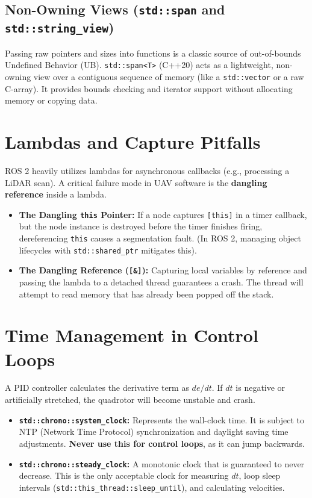 \documentclass{article}
\begin{document}
\subsection{Non-Owning Views (\texttt{std::span} and \texttt{std::string\_view})}
Passing raw pointers and sizes into functions is a classic source of out-of-bounds Undefined Behavior (UB). \texttt{std::span<T>} (C++20) acts as a lightweight, non-owning view over a contiguous sequence of memory (like a \texttt{std::vector} or a raw C-array). It provides bounds checking and iterator support without allocating memory or copying data.

\section{Lambdas and Capture Pitfalls}
ROS 2 heavily utilizes lambdas for asynchronous callbacks (e.g., processing a LiDAR scan). A critical failure mode in UAV software is the \textbf{dangling reference} inside a lambda.

\begin{itemize}
    \item \textbf{The Dangling \texttt{this} Pointer:} If a node captures \texttt{[this]} in a timer callback, but the node instance is destroyed before the timer finishes firing, dereferencing \texttt{this} causes a segmentation fault. (In ROS 2, managing object lifecycles with \texttt{std::shared\_ptr} mitigates this).
    \item \textbf{The Dangling Reference (\texttt{[\&]}):} Capturing local variables by reference and passing the lambda to a detached thread guarantees a crash. The thread will attempt to read memory that has already been popped off the stack.
\end{itemize}

\section{Time Management in Control Loops}
A PID controller calculates the derivative term as $de / dt$. If $dt$ is negative or artificially stretched, the quadrotor will become unstable and crash.
\begin{itemize}
    \item \textbf{\texttt{std::chrono::system\_clock}:} Represents the wall-clock time. It is subject to NTP (Network Time Protocol) synchronization and daylight saving time adjustments. \textbf{Never use this for control loops}, as it can jump backwards.
    \item \textbf{\texttt{std::chrono::steady\_clock}:} A monotonic clock that is guaranteed to never decrease. This is the only acceptable clock for measuring $dt$, loop sleep intervals (\texttt{std::this\_thread::sleep\_until}), and calculating velocities.
\end{itemize}
\end{document}
